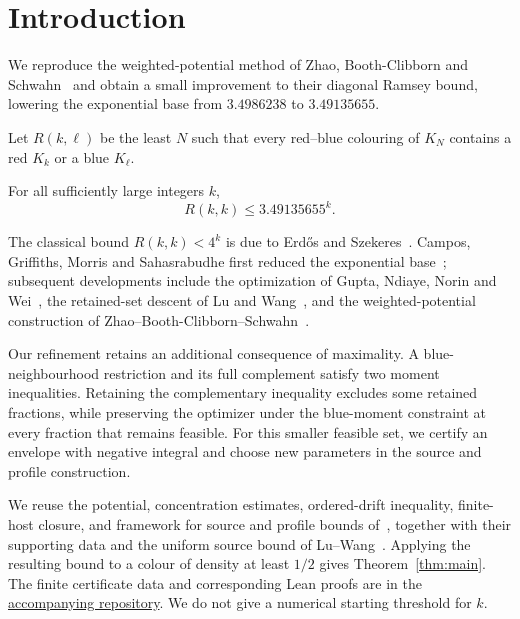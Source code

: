 \section{Introduction}
\label{sec:introduction}

We reproduce the weighted-potential method of Zhao, Booth-Clibborn and
Schwahn~\cite{ZBS} and obtain a small improvement to their diagonal
Ramsey bound, lowering the exponential base from $3.4986238$ to
$3.49135655$.

Let $R(k,\ell)$ be the least $N$ such that every red--blue colouring of
$K_N$ contains a red $K_k$ or a blue $K_\ell$.

\begin{theorem}\label{thm:main}
For all sufficiently large integers $k$,
\[
 R(k,k)\le 3.49135655^k.
\]
\end{theorem}

The classical bound $R(k,k)<4^k$ is due to Erd\H{o}s and
Szekeres~\cite{ES}. Campos, Griffiths, Morris and Sahasrabudhe first
reduced the exponential base~\cite{CGMS}; subsequent developments include
the optimization of Gupta, Ndiaye, Norin and Wei~\cite{GNNW}, the
retained-set descent of Lu and Wang~\cite{LW}, and the weighted-potential
construction of Zhao--Booth-Clibborn--Schwahn~\cite[Theorem~1.1]{ZBS}.

Our refinement retains an additional consequence of maximality. A
blue-neighbourhood restriction and its full complement satisfy two
moment inequalities. Retaining the complementary inequality excludes
some retained fractions, while preserving the optimizer under the blue-moment
constraint at every fraction that remains feasible. For this smaller feasible
set, we certify an envelope with negative integral and choose new parameters
in the source and profile construction.

We reuse the potential, concentration estimates, ordered-drift inequality,
finite-host closure, and framework for source and profile bounds
of~\cite[Sections~3--5]{ZBS}, together with
their supporting data and the uniform source bound of
Lu--Wang~\cite[Lemma~B.1]{LW}. Applying the resulting bound to a colour
of density at least $1/2$ gives Theorem~\ref{thm:main}.
The finite certificate data and corresponding Lean proofs are in the
\href{https://github.com/EvolvingPrograms/DiagonalRamsey}{accompanying repository}.
We do not give a numerical starting threshold for $k$.
